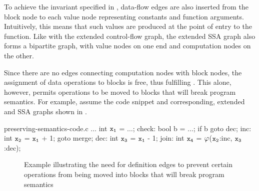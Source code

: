 To achieve the invariant specified in
, \glspl{data-flow
  edge} are also inserted from the  \gls{block node} to
each \gls{value node} representing constants and function arguments.
%
Intuitively, this means that such values are produced at the point of entry to
the \gls{function}.
%
Like with the extended \gls{control-flow graph}, the extended \gls{SSA graph}
also forms a bipartite \gls{graph}, with \glspl{value node} on one end and
\glspl{computation node} on the other.

Since there are no \glspl{edge} connecting \glspl{computation node} with
\glspl{block node}, the assignment of data \glspl{operation} to \glspl{block} is
free, thus fulfilling .
%
This alone, however, permits \glspl{operation} to be moved to \glspl{block} that
will break \gls{program} semantics.
%
For example, assume the code snippet and corresponding, extended
 and \glspl{SSA graph} shown in
.
%
\begin{filecontents*}{preserving-semantics-code.c}
  $\ldots$
  int $\irVar{x}[1]$ = $\ldots$;
check:
  bool b = $\ldots$;
  if b goto dec;
inc:
  int $\irVar{x}[2]$ = $\irVar{x}[1]$ + 1;
  goto merge;
dec:
  int $\irVar{x}[3]$ = $\irVar{x}[1]$ - 1;
join:
  int $\irVar{x}[4]$ = $\mPhi$($\irVar{x}[2]$:inc, $\irVar{x}[3]$:dec);
\end{filecontents*}
%
\begin{figure}
  \centering

  \mbox{}%
  \hfill%
  \hfill\hfill\hfill%
  \hfill%
  \mbox{}

  \caption[Example illustrating the need for definition edges]%
          {%
            Example illustrating the need for definition edges to prevent
            certain operations from being moved into blocks that will break
            program semantics%
          }
\end{figure}
